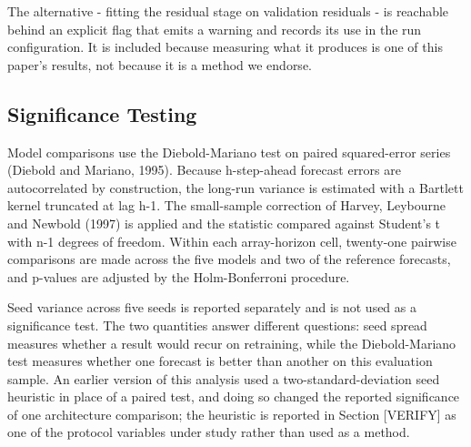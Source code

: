 The alternative - fitting the residual stage on validation residuals -
is reachable behind an explicit flag that emits a warning and records
its use in the run configuration. It is included because measuring what
it produces is one of this paper's results, not because it is a method
we endorse.

\subsection{Significance Testing}

Model comparisons use the Diebold-Mariano test on paired squared-error
series (Diebold and Mariano, 1995). Because h-step-ahead forecast errors are
autocorrelated by construction, the long-run variance is estimated with
a Bartlett kernel truncated at lag h-1. The small-sample correction of
Harvey, Leybourne and Newbold (1997) is applied and the statistic
compared against Student's t with n-1 degrees of freedom. Within each
array-horizon cell, twenty-one pairwise comparisons are made across the
five models and two of the reference forecasts, and p-values are
adjusted by the Holm-Bonferroni procedure.

Seed variance across five seeds is reported separately and is not used
as a significance test. The two quantities answer different questions:
seed spread measures whether a result would recur on retraining, while
the Diebold-Mariano test measures whether one forecast is better than
another on this evaluation sample. An earlier version of this analysis
used a two-standard-deviation seed heuristic in place of a paired test,
and doing so changed the reported significance of one architecture
comparison; the heuristic is reported in Section [VERIFY] as one of the
protocol variables under study rather than used as a method.
